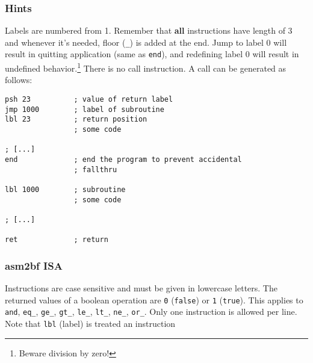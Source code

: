 \documentclass{article}
\begin{document}
\subsubsection{Hints}
\par Labels are numbered from 1. Remember that \textbf{all} instructions have length of 3 and whenever it's needed, floor (\verb|_|) is added at the end. Jump to label 0 will result in quitting application (same as \verb|end|), and redefining label 0 will result in undefined behavior.\footnote{Beware division by zero!} There is no call instruction.  A call can be generated as follows:

\begin{verbatim}
psh 23          ; value of return label
jmp 1000        ; label of subroutine
lbl 23          ; return position
                ; some code

; [...]
end             ; end the program to prevent accidental
                ; fallthru

lbl 1000        ; subroutine
                ; some code

; [...]

ret             ; return
\end{verbatim}

\subsubsection{asm2bf ISA}
\par Instructions are case sensitive and must be given in lowercase letters. The returned values of a boolean operation are \verb|0| (\verb|false|) or \verb|1| (\verb|true|). This applies to \verb|and|, \verb|eq_|, \verb|ge_|, \verb|gt_|, \verb|le_|, \verb|lt_|, \verb|ne_|, \verb|or_|. Only one instruction is allowed per line. Note that \verb|lbl| (label) is treated an instruction

\end{document}
